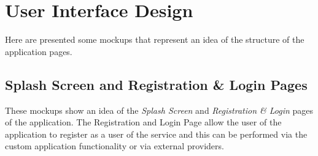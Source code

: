 \chapter{User Interface Design} \label{chap4}
Here are presented some mockups that represent an idea of the structure of the application pages.

\section{Splash Screen and Registration \& Login Pages}
These mockups show an idea of the \textit{Splash Screen} and \textit{Registration \& Login} pages of the application. The Registration and Login Page allow the user of the application to register as a user of the service and this can be performed via the custom application functionality or via external providers.\\

